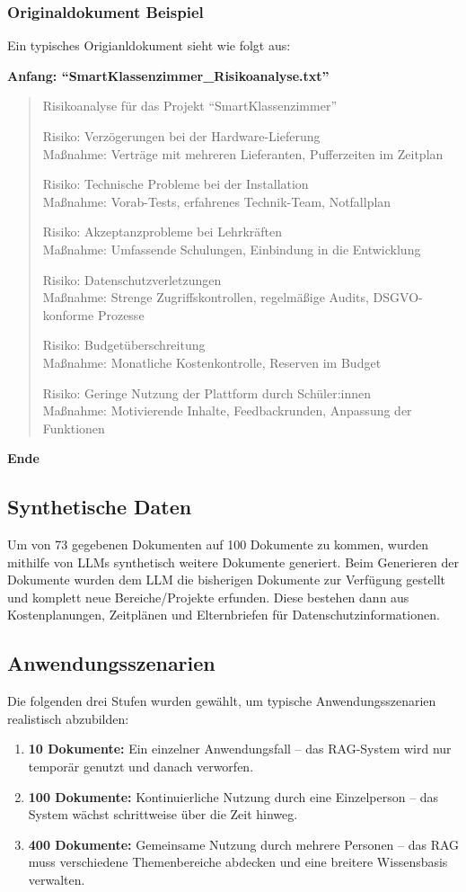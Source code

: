 \subsubsection{Originaldokument Beispiel}
Ein typisches Origianldokument sieht wie folgt aus:

\textbf{Anfang: \enquote{SmartKlassenzimmer\_Risikoanalyse.txt}}
\begin{quote}
Risikoanalyse für das Projekt \enquote{SmartKlassenzimmer}

Risiko: Verzögerungen bei der Hardware-Lieferung\\
Maßnahme: Verträge mit mehreren Lieferanten, Pufferzeiten im Zeitplan

Risiko: Technische Probleme bei der Installation\\
Maßnahme: Vorab-Tests, erfahrenes Technik-Team, Notfallplan

Risiko: Akzeptanzprobleme bei Lehrkräften\\
Maßnahme: Umfassende Schulungen, Einbindung in die Entwicklung

Risiko: Datenschutzverletzungen\\
Maßnahme: Strenge Zugriffskontrollen, regelmäßige Audits, DSGVO-konforme Prozesse

Risiko: Budgetüberschreitung\\
Maßnahme: Monatliche Kostenkontrolle, Reserven im Budget

Risiko: Geringe Nutzung der Plattform durch Schüler:innen\\
Maßnahme: Motivierende Inhalte, Feedbackrunden, Anpassung der Funktionen
\end{quote}
\textbf{Ende}


\subsection{Synthetische Daten}
Um von 73 gegebenen Dokumenten auf 100 Dokumente zu kommen, wurden mithilfe von LLMs synthetisch weitere Dokumente generiert.
Beim Generieren der Dokumente wurden dem LLM die bisherigen Dokumente zur Verfügung gestellt und komplett neue Bereiche/Projekte erfunden. Diese bestehen dann aus Kostenplanungen, Zeitplänen und Elternbriefen für Datenschutzinformationen.

\subsection{Anwendungsszenarien}
Die folgenden drei Stufen wurden gewählt, um typische Anwendungsszenarien realistisch abzubilden:
\begin{enumerate}
    \item \textbf{10 Dokumente:} Ein einzelner Anwendungsfall – das RAG-System wird nur temporär genutzt und danach verworfen.
    \item \textbf{100 Dokumente:} Kontinuierliche Nutzung durch eine Einzelperson – das System wächst schrittweise über die Zeit hinweg.
    \item \textbf{400 Dokumente:} Gemeinsame Nutzung durch mehrere Personen – das RAG muss verschiedene Themenbereiche abdecken und eine breitere Wissensbasis verwalten.
\end{enumerate}

